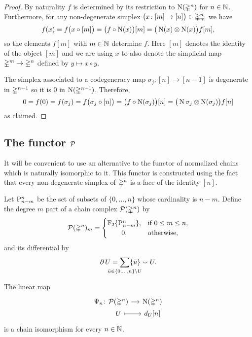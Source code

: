 \begin{proof}
	By naturality $f$ is determined by its restriction to $\chains(\simplex^n)$ for $n \in \N$.
	Furthermore, for any non-degenerate simplex $\big( x \colon [m] \to [n] \big) \in \simplex^n_m$ we have
	\[
	f(x) = f \big( x \circ [m] \big) =
	\big( f \circ \chains(x) \big) [m] =
	\big( \chains(x) \ot \chains(x) \big) f[m],
	\]
	so the elements $f[m]$ with $m \in \N$ determine $f$.
	Here $[m]$ denotes the identity of the object $[m]$ and we are using $x$ to also denote the simplicial map $\simplex^m \to \simplex^n$ defined by $y \mapsto x \circ y$.

	The simplex associated to a codegeneracy map $\sigma_j \colon [n] \to [n-1]$ is degenerate in $\simplex^{n-1}$ so it is $0$ in $\chains(\simplex^{n-1})$.
	Therefore,
	\[
	0 = f(0) = f(\sigma_j) =
	f \big( \sigma_j \circ [n] \big) =
	\big( f \circ \chains(\sigma_j) \big) [n] =
	\big( \chains \sigma_j \ot \chains(\sigma_j) \big) f[n]
	\]
	as claimed.
\end{proof}

\subsection{The functor $\cP$}

It will be convenient to use an alternative to the functor of normalized chains which is naturally isomorphic to it.
This functor is constructed using the fact that every non-degenerate simplex of $\simplex^n$ is a face of the identity $[n]$.

\begin{definition} \label{d:dual chains}
	Let $\P_{n-m}^n$ be the set of subsets of $\{0, \dots, n\}$ whose cardinality is $n-m$.
	Define the degree $m$ part of a chain complex $\cP(\simplex^n)$ by
	\[
	\cP(\simplex^n)_m = \begin{cases}
	\F\{\P_{n-m}^n\}, & \text{if } 0 \leq m \leq n, \\
	\hfil 0, & \text{otherwise},
	\end{cases}
	\]
	and its differential by
	\begin{equation} \label{e:boundary of P}
	\bd U =
	\sum_{\mathclap{\bar u \in \{0, \dots, n\} \setminus U}} \{\bar u\} \union U.
	\end{equation}
\end{definition}

\begin{lemma}
	The linear map
	\[
	\begin{tikzcd} [column sep=small, row sep=0]
	\Psi_n \colon &[-20pt] \cP(\simplex^n) \arrow[r] & \chains(\simplex^n) \\
	& U \arrow[r, mapsto] & d_U [n]
	\end{tikzcd}
	\]
	is a chain isomorphism for every $n \in \N$.
\end{lemma}

